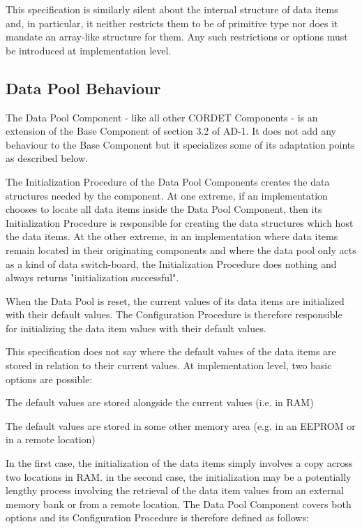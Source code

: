 \documentclass[a4paper,10pt]{article}
\newenvironment{fw_enumerate}					%
{\begin{enumerate}
  \setlength{\itemsep}{1mm}
  \setlength{\parskip}{0pt}
  \setlength{\parsep}{0pt}}
{\end{enumerate}}
\begin{document}
This specification is similarly silent about the internal structure of data items and, in particular, it neither restricts them to be of primitive type nor does it mandate an array-like structure for them. Any such restrictions or options must be introduced at implementation level.

\subsection{Data Pool Behaviour}\label{sec:dpBehaviour}
The Data Pool Component - like all other CORDET Components - is an extension of the Base Component of section 3.2 of AD-1. It does not add any behaviour to the Base Component but it specializes some of its adaptation points as described below.

The Initialization Procedure of the Data Pool Components creates the data structures needed by the component. At one extreme, if an implementation chooses to locate all data items inside the Data Pool Component, then its Initialization Procedure is responsible for creating the data structures which host the data items. At the other extreme, in an implementation where data items remain located in their originating components and where the data pool only acts as a kind of data switch-board, the Initialization Procedure does nothing and always returns "initialization successful".

When the Data Pool is reset, the current values of its data items are initialized with their default values. The Configuration Procedure is therefore responsible for initializing the data item values with their default values. 

This specification does not say where the default values of the data items are stored in relation to their current values. At implementation level, two basic options are possible:

\begin{fw_enumerate}
\item The default values are stored alongside the current values (i.e. in RAM)
\item The default values are stored in some other memory area (e.g. in an EEPROM or in a remote location)
\end{fw_enumerate}

In the first case, the initialization of the data items simply involves a copy across two locations in RAM. in the second case, the initialization may be a potentially lengthy process involving the retrieval of the data item values from an external memory bank or from a remote location. The Data Pool Component covers both options and its Configuration Procedure is therefore defined as follows:
\end{document}
